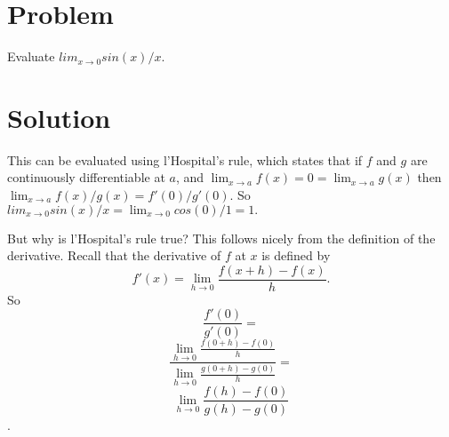 \documentclass[11pt,a4paper]{report}
\theoremstyle{plain}
\theoremstyle{definition}
\theoremstyle{remark}
\begin{document}
\section*{Problem}
Evaluate $lim_{x\to 0} sin(x)/x$.

\section*{Solution}
This can be evaluated using l'Hospital's rule, which states that if $f$ and $g$ are continuously differentiable at $a$, and  $\lim_{x \to a} f(x) = 0 =  \lim_{x \to a} g(x)$ then $\lim_{x \to a} {f(x)/g(x)} = f'(0) / g'(0)$.  So $lim_{x\to 0} sin(x)/x = \lim_{x \to 0} {cos(0) / 1} = 1.$

But why is l'Hospital's rule true?  This follows nicely from the definition of the derivative.  Recall that the derivative of $f$ at $x$ is defined by
$$f'(x) = \lim_{h \to 0} \frac{f(x + h) - f(x)}{h}.$$
So $$\frac{f'(0)}{g'(0)} = $$ $$\frac{\mathop{\lim}\limits_{h \to 0} \frac {f(0 + h) - f(0)} {h}} {\mathop{\lim}\limits_{h \to 0} \frac {g(0 + h) - g(0)} {h}} = $$ $$\lim_{h \to 0} \frac {f(h) - f(0)} {g(h) - g(0)}$$.
\end{document}
